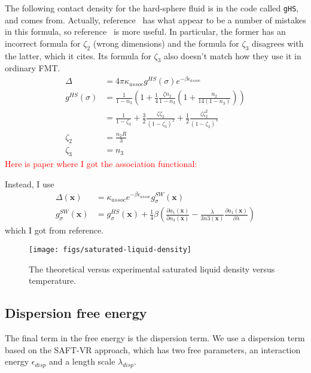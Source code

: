 \documentclass[letterpaper,twocolumn,amsmath,amssymb,prb]{revtex4-1}
\newcommand{\xx}{\textbf{x}}
\begin{document}
The following contact density for the hard-sphere fluid is in the code
called \texttt{gHS}, and comes
from\cite{yu2002fmt-dft-inhomogeneous-associating,
  fu2005vapor-liquid-dft}.  Actually,
reference~\cite{fu2005vapor-liquid-dft} has what appear to be a number
of mistakes in this formula, so
reference~\cite{yu2002fmt-dft-inhomogeneous-associating} is more
useful.  In particular, the former has an incorrect formula for
$\zeta_2$ (wrong dimensions) and the formula for $\zeta_3$ disagrees
with the latter, which it cites.  Its formula for $\zeta_3$ also
doesn't match how they use it in ordinary FMT.
\begin{align}
  \Delta &= 4\pi \kappa_\textit{assoc} g^\textit{HS}(\sigma)e^{-\beta
    \epsilon_\textit{assoc}} \\
  g^\textit{HS}(\sigma) &= \frac1{1-n_3}\left(1+\frac14\frac{\zeta n_2}{1-n_3}
  \left(1 + \frac{n_2}{14 (1-n_3)}\right)\right) \\
  &= \frac1{1 - \zeta_3}
  + \frac32 \frac{\zeta \zeta_2}{\left(1-\zeta_3\right)^2}
  + \frac12 \frac{\zeta \zeta_2^2}{\left(1-\zeta_3\right)^3} \\
  \zeta_2 &= \frac{n_2 R}{3} \\
  \zeta_3 &= n_3
\end{align}
\textcolor{red}{Here is paper where I got the association functional:}\cite{clark2006developing}

Instead, I use
\begin{align}
  \Delta(\xx) &= \kappa_\textit{assoc}
  e^{-\beta\epsilon_\textit{assoc}} g^\textit{SW}_\sigma(\xx) \\
  g^\textit{SW}_\sigma(\xx) &= g^\textit{HS}_\sigma(\xx) +
  \frac{1}{4}\beta\left(\frac{\partial a_1(\xx)}{\partial n_3(\xx)} -
  \frac{\lambda}{3 n3(\xx)}\frac{\partial a_1(\xx)}{\partial \lambda}\right)
\end{align}
which I got from reference\cite{gil-villegas-1997-SAFT-VR}.

\begin{figure}
\begin{center}
\texttt{[image: figs/saturated-liquid-density]}
\end{center}
\caption{The theoretical versus experimental saturated liquid density
  versus temperature.  }
\label{fig:saturated-liquid-density}
\end{figure}

\subsection{Dispersion free energy}
The final term in the free energy is the dispersion term.  We use a
dispersion term based on the SAFT-VR
approach\cite{gil-villegas-1997-SAFT-VR}, which has two free
parameters, an interaction energy $\epsilon_\textit{disp}$ and a
length scale $\lambda_\textit{disp}$.
\end{document}
